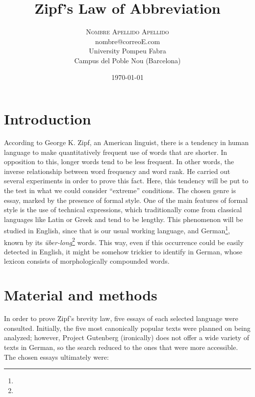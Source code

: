 \documentclass[a4paper]{article}
\title{Zipf’s Law of Abbreviation}
\author{
	\textsc{Nombre Apellido Apellido}\\[1ex]
	\normalsize{nombre@correoE.com}\\[1ex]
	\normalsize University Pompeu Fabra\\
	\normalsize Campus del Poble Nou (Barcelona)
	}
\date{\today}
\begin{document}
\pagestyle{empty} %
\maketitle
\thispagestyle{empty} %


\section{Introduction}

According to George K. Zipf, an American linguist, there is a tendency in human
language to make quantitatively frequent use of words that are shorter. In
opposition to this, longer words tend to be less frequent. In other words, the
inverse relationship between word frequency and word rank. He carried out
several experiments in order to prove this fact. Here, this tendency will be
put to the test in what we could consider ``extreme'' conditions. The chosen
genre is essay, marked by the presence of formal style. One of the main
features of formal style is the use of technical expressions, which
traditionally come from classical languages like Latin or Greek and tend to be
lengthy. This phenomenon will be studied in English, since that is our usual
working language, and German\footnote{}, known by its \textit{über-long}\footnote{}
words. This way, even if this occurrence could be easily detected in English,
it might be somehow trickier to identify in German, whose lexicon consists of
morphologically compounded words.

\section{Material and methods}

In order to prove Zipf’s brevity law, five essays of each selected language
were consulted. Initially, the five most canonically popular texts were planned
on being analyzed; however, Project Gutenberg (ironically) does not offer a
wide variety of texts in German, so the search reduced to the ones that were
more accessible. The chosen essays ultimately were:
\end{document}
